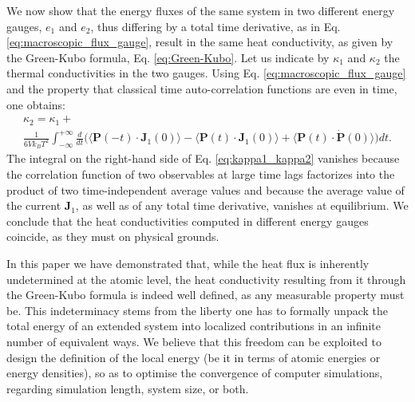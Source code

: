We now show that the energy fluxes of the same system in two different
energy gauges, $e_{1}$ and $e_{2}$, thus differing by a total time
derivative, as in Eq. \eqref{eq:macroscopic_flux_gauge}, result in the
same heat conductivity, as given by the Green-Kubo formula,
Eq. \eqref{eq:Green-Kubo}. Let us indicate by $\kappa_{1}$ and
$\kappa_{2}$ the thermal conductivities in the two gauges.  Using
Eq. \eqref{eq:macroscopic_flux_gauge} and the property that classical
time auto-correlation functions are even in time, one obtains:
\begin{multline}
  \kappa_{2} = \kappa_{1} + \\ \frac{1}{6Vk_{B}T^{2}}
  \int_{-\infty}^{+\infty}\frac{d}{dt}
  \bigl(\langle\textbf{P}(-t) \cdot\mathbf{J}_{1}(0) \rangle-
  \langle\textbf{P}(t) \cdot\mathbf{J}_{1}(0)\rangle+
  \langle\textbf{P}(t)\cdot
  \dot{\mathbf{P}}(0)
  \rangle\bigr)
  dt. \label{eq:kappa1_kappa2}
\end{multline}
The integral on the right-hand side of Eq. \eqref{eq:kappa1_kappa2}
vanishes because the correlation function of two observables at large
time lags factorizes into the product of two time-independent average
values and because the average value of the current $\mathbf{J}_{1}$, as
well as of any total time derivative, vanishes at equilibrium. We
conclude that the heat conductivities computed in different energy
gauges coincide, as they must on physical grounds.

In this paper we have demonstrated that, while the heat flux is
inherently undetermined at the atomic level, the heat conductivity
resulting from it through the Green-Kubo formula is indeed well
defined, as any measurable property must be. This indeterminacy stems
from the liberty one has to formally unpack the total energy of an
extended system into localized contributions in an infinite number of
equivalent ways.  We believe that this freedom can be exploited to
design the definition of the local energy (be it in terms of atomic
energies or energy densities), so as to optimise the convergence of
computer simulations, regarding simulation length, system size, or
both.

